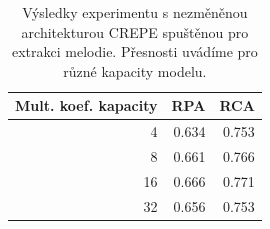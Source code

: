 \begin{table}[h!]

\centering

\begin{tabular}{rrr}
\toprule
Mult. koef. kapacity &   RPA &   RCA \\
\midrule
                   4 & 0.634 & 0.753 \\
                   8 & 0.661 & 0.766 \\
                  16 & 0.666 & 0.771 \\
                  32 & 0.656 & 0.753 \\
\bottomrule
\end{tabular}
\caption{Výsledky experimentu s nezměněnou architekturou CREPE spuštěnou pro extrakci melodie. Přesnosti uvádíme pro různé kapacity modelu.}\label{tab:crepe_capacity_experiment}
\end{table}

